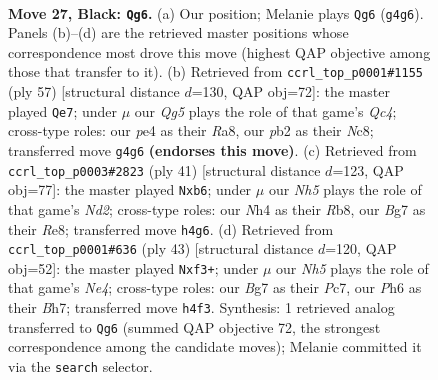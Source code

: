 \documentclass[11pt]{article}
\begin{document}
\clearpage

\begin{figure}[p]\centering
\begin{subfigure}{0.46\textwidth}\centering
\resizebox{\linewidth}{!}{%
\newchessgame
\chessboard[
  setfen={nrbr2k1/5pb1/p6p/2p1p3/1p2P1qn/3P1P2/PPQB2B1/RN2NRK1 b - - 0 27},
  showmover=false,
  pgfstyle=straightmove, color=movearrow, markmove={g4-g6}
]}
\caption{}
\end{subfigure}\hfill
\begin{subfigure}{0.46\textwidth}\centering
\resizebox{\linewidth}{!}{%
\newchessgame
\chessboard[
  setfen={r1nr1bk1/1pp2pp1/5n1p/p1q1p3/1PP1P3/5NNP/2QB1PP1/R2R2K1 b - - 0 29},
  showmover=false,
  pgfstyle=straightmove, color=movearrow, markmove={c5-e7}
]}
\caption{}
\end{subfigure}
\\[4pt]
\begin{subfigure}{0.46\textwidth}\centering
\resizebox{\linewidth}{!}{%
\newchessgame
\chessboard[
  setfen={1rb1r1k1/2qn1ppn/pP1pp3/4b1P1/4P3/2N1BN2/1PPQ2BP/R4R1K b - - 0 21},
  showmover=false,
  pgfstyle=straightmove, color=movearrow, markmove={d7-b6}
]}
\caption{}
\end{subfigure}\hfill
\begin{subfigure}{0.46\textwidth}\centering
\resizebox{\linewidth}{!}{%
\newchessgame
\chessboard[
  setfen={1k1r1b1r/1pp3pb/p4p1p/P3n3/3PP1q1/2P2N2/3B2PP/R2QRBK1 b - - 2 22},
  showmover=false,
  pgfstyle=straightmove, color=movearrow, markmove={e5-f3}
]}
\caption{}
\end{subfigure}
\caption{\textbf{Move 27, Black: \texttt{Qg6}.} (a) Our position; Melanie plays \texttt{Qg6} (\texttt{g4g6}). Panels (b)--(d) are the retrieved master positions whose correspondence most drove this move (highest QAP objective among those that transfer to it). (b) Retrieved from \texttt{ccrl\_top\_p0001\#1155} (ply 57) [structural distance $d$=130, QAP obj=72]: the master played \texttt{Qe7}; under $\mu$ our \emph{Qg5} plays the role of that game's \emph{Qc4}; cross-type roles: our \emph{p}e4 as their \emph{R}a8, our \emph{p}b2 as their \emph{N}c8; transferred move \texttt{g4g6} \textbf{(endorses this move)}. (c) Retrieved from \texttt{ccrl\_top\_p0003\#2823} (ply 41) [structural distance $d$=123, QAP obj=77]: the master played \texttt{Nxb6}; under $\mu$ our \emph{Nh5} plays the role of that game's \emph{Nd2}; cross-type roles: our \emph{N}h4 as their \emph{R}b8, our \emph{B}g7 as their \emph{R}e8; transferred move \texttt{h4g6}. (d) Retrieved from \texttt{ccrl\_top\_p0001\#636} (ply 43) [structural distance $d$=120, QAP obj=52]: the master played \texttt{Nxf3+}; under $\mu$ our \emph{Nh5} plays the role of that game's \emph{Ne4}; cross-type roles: our \emph{B}g7 as their \emph{P}c7, our \emph{P}h6 as their \emph{B}h7; transferred move \texttt{h4f3}. Synthesis: 1 retrieved analog transferred to \texttt{Qg6} (summed QAP objective 72, the strongest correspondence among the candidate moves); Melanie committed it via the \texttt{search} selector.}
\label{fig:thought-m53}
\end{figure}
\end{document}
